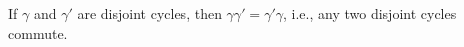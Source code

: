 If $\gamma$ and $\gamma'$ are disjoint cycles, then $\gamma\gamma' = \gamma'\gamma$, i.e., any two disjoint cycles commute.
